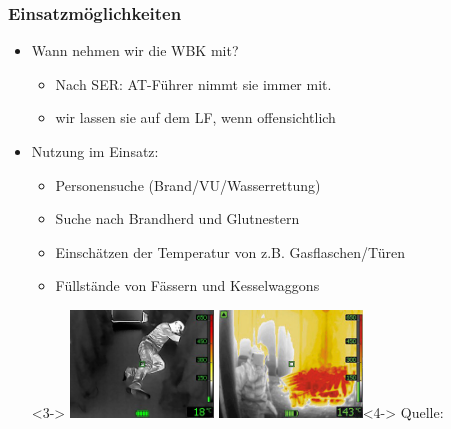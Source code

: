 \documentclass[aspectratio=169]{beamer}
\begin{document}
            \begin{frame}[t]
            \frametitle{Einsatzmöglichkeiten}
            \begin{itemize}
            \item Wann nehmen wir die WBK mit?
            \begin{itemize}
            \item Nach SER: AT-Führer nimmt sie immer mit.
            \item wir lassen sie auf dem LF, wenn offensichtlich
            \end{itemize}
            \item<2-> Nutzung im Einsatz:
                \begin{itemize}
                \item<3-> Personensuche (Brand/VU/Wasserrettung)
                    \item<4-> Suche nach Brandherd und Glutnestern
                        \item<5-> Einschätzen der Temperatur von z.B. Gasflaschen/Türen
                            \item<6-> Füllstände von Fässern und Kesselwaggons
                                \end{itemize}
                                \item[]<3-> \includegraphics[width=0.3\textwidth, keepaspectratio]{wuerfelblick_raw/boden} \includegraphics[width=0.3\textwidth, keepaspectratio]{feuer}<4->
					\hspace*{15pt}\hbox{\scriptsize Quelle:}
                                        \end{itemize}
                                        \end{frame}

\end{document}
